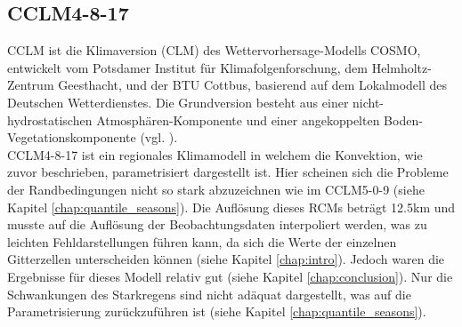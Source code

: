 \subsection{CCLM4-8-17}
CCLM ist die Klimaversion (CLM) des Wettervorhersage-Modells COSMO, entwickelt vom Potsdamer Institut für Klimafolgenforschung, dem Helmholtz-Zentrum Geesthacht, und der BTU Cottbus, basierend auf dem Lokalmodell des Deutschen Wetterdienstes. Die Grundversion besteht aus einer nicht-hydrostatischen Atmosphären-Komponente und einer angekoppelten Boden-Vegetationskomponente (vgl. \cite{CCLM}).\\
CCLM4-8-17 ist ein regionales Klimamodell in welchem die Konvektion, wie zuvor beschrieben, parametrisiert dargestellt ist. Hier scheinen sich die Probleme der Randbedingungen nicht so stark abzuzeichnen wie im CCLM5-0-9 (siehe Kapitel \ref{chap:quantile_seasons}). Die Auflösung dieses RCMs beträgt 12.5km und musste auf die Auflösung der Beobachtungsdaten interpoliert werden, was zu leichten Fehldarstellungen führen kann, da sich die Werte der einzelnen Gitterzellen unterscheiden können (siehe Kapitel \ref{chap:intro}). Jedoch waren die Ergebnisse für dieses Modell relativ gut (siehe Kapitel \ref{chap:conclusion}). Nur die Schwankungen des Starkregens sind nicht adäquat dargestellt, was auf die Parametrisierung zurückzuführen ist (siehe Kapitel \ref{chap:quantile_seasons}).
\newpage

